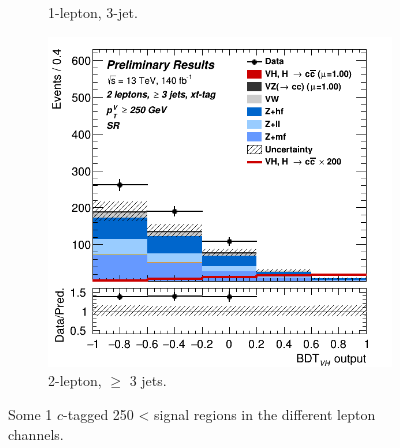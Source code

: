 \begin{figure}[h!]
\begin{subfigure}[b]{0.32\textwidth}
      \caption{1-lepton, 3-jet.}
      \label{fig:plots_VHcc_ex_1L_SR_1C}
  \end{subfigure}
  \begin{subfigure}[b]{0.32\textwidth}
    \centering
    \includegraphics[width=\textwidth]{Images/VH/Own_fit/prefit_VHcc/Region_distmva_BMin250_DSR_J3_TTypext_incJet1_T2_L2_Y6051_Prefit.png}
    \caption{2-lepton, $\geq$ 3 jets.}
    \label{fig:plots_VHcc_ex_2L_SR_1C}
\end{subfigure}
  \caption{Some 1 $c$-tagged 250 < \ptv signal regions in the different lepton channels.}
  \label{fig:plots_VHcc_ex_SR_1C}
\end{figure} 



